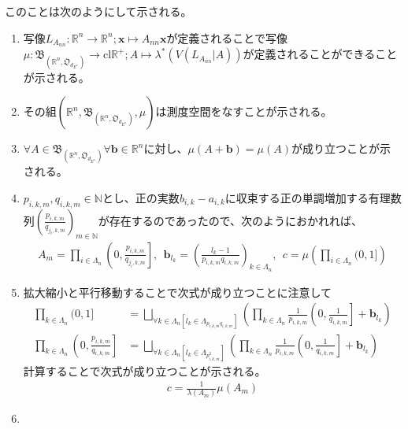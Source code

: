 \documentclass[dvipdfmx]{jsarticle}
\begin{document}
このことは次のようにして示される。
\begin{enumerate}
\item
  写像$L_{A_{nn}}:\mathbb{R}^{n} \rightarrow \mathbb{R}^{n};\mathbf{x} \mapsto A_{nn}\mathbf{x}$が定義されることで写像$\mu:\mathfrak{B}_{\left( \mathbb{R}^{n},\mathfrak{O}_{d_{E^{n}}} \right)} \rightarrow \mathrm{cl}\mathbb{R}^{+};A \mapsto \lambda^{*}\left( V\left( L_{A_{nn}}|A \right) \right)$が定義されることができることが示される。
\item
  その組$\left( \mathbb{R}^{n},\mathfrak{B}_{\left( \mathbb{R}^{n},\mathfrak{O}_{d_{E^{n}}} \right)},\mu \right)$は測度空間をなすことが示される。
\item
  $\forall A \in \mathfrak{B}_{\left( \mathbb{R}^{n},\mathfrak{O}_{d_{E^{n}}} \right)}\forall\mathbf{b} \in \mathbb{R}^{n}$に対し、$\mu\left( A + \mathbf{b} \right) = \mu(A)$が成り立つことが示される。
\item
  $p_{i,k,m},q_{i,k,m} \in \mathbb{N}$とし、正の実数$b_{i,k} - a_{i,k}$に収束する正の単調増加する有理数列$\left( \frac{p_{i,k,m}}{q_{j_{i},k,m}} \right)_{m \in \mathbb{N}}$が存在するのであったので、次のようにおかれれば、
  \begin{align*}
  A_{m} = \prod_{i \in \varLambda_{n}} \left( 0,\frac{p_{i,k,m}}{q_{j_{i},k,m}} \right],\ \ \mathbf{b}_{l_{k}} = \left( \frac{l_{k} - 1}{p_{i,k,m}q_{i,k,m}} \right)_{k \in \varLambda_{n}},\ \ c = \mu\left( \prod_{i \in \varLambda_{n}} (0,1] \right)
  \end{align*}
\item
  拡大縮小と平行移動することで次式が成り立つことに注意して
  \begin{align*}
  \prod_{k \in \varLambda_{n}} (0,1] &= \bigsqcup_{\forall k \in \varLambda_{n}\left[ l_{k} \in \varLambda_{p_{i,k,m}q_{i,k,m}} \right]} \left( \prod_{k \in \varLambda_{n}} {\frac{1}{p_{i,k,m}}\left( 0,\frac{1}{q_{i,k,m}} \right]} + \mathbf{b}_{l_{k}} \right)\\
  \prod_{k \in \varLambda_{n}} \left( 0,\frac{p_{i,k,m}}{q_{i,k,m}} \right] &= \bigsqcup_{\forall k \in \varLambda_{n}\left[ l_{k} \in \varLambda_{p_{i,k,m}^{2}} \right]} \left( \prod_{k \in \varLambda_{n}} {\frac{1}{p_{i,k,m}}\left( 0,\frac{1}{q_{i,k,m}} \right]} + \mathbf{b}_{l_{k}} \right)
  \end{align*}
  計算することで次式が成り立つことが示される。
  \begin{align*}
  c = \frac{1}{\lambda\left( A_{m} \right)}\mu\left( A_{m} \right)
  \end{align*}
\item

\end{enumerate}
\end{document}
